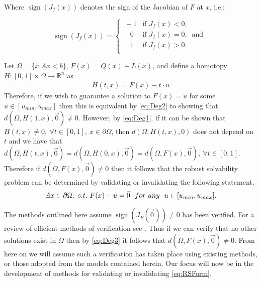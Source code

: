 \documentclass[11pt]{article}
\theoremstyle{plain}
\theoremstyle{definition}
\theoremstyle{remark}
\begin{document}
Where $\operatorname{sign}\left(J_f(x)\right)$ denotes the sign of the Jacobian of $F$ at $x$, i.e.:

\[\operatorname{sign}\left(J_f(x)\right)=   \left\{
\begin{array}{ll}
       \ -1   & \mbox{if } J_f(x)< 0, \\
      \quad 0 & \mbox{if } J_f(x)= 0,~\mbox{ and } \\
      \quad 1 & \mbox{if } J_f(x)> 0. \\
\end{array} 
\right. \]

Let $\Omega=\{x| Ax< b\}$, $F(x)=Q(x)+L(x)$, and define a homotopy $H : [0,1]\times\bar{\Omega}\rightarrow\mathbb{R}^n$ as 
\begin{align}
H(t,x) = F(x)-t\cdot u \label{eq:Homo}
\end{align}
Therefore, if we wish to guarantee a solution to $F(x)=u$ for some $u\in[u_{min},u_{max}]$ then this is equivalent by \cref{eq:Deg2} to showing that $d(\Omega,H(1,x),\vec{0})\neq 0$. However, by \cref{eq:Deg1}, if it can be shown that $H(t,x)\neq 0, \  \forall t\in[0,1], \  x\in\partial\Omega$, then $d\left(\Omega,H(t,x),0\right)$ does not depend on $t$ and we have that $d\left(\Omega,H(t,x),\vec{0}\right)=d\left(\Omega,H(0,x),\vec{0}\right)=d(\Omega,F(x),\vec{0}), \ \forall t\in[0,1]$. \\

Therefore if $d(\Omega,F(x),\vec{0})\neq 0$ then it follows that the robust solvability problem can be determined by validating or invalidating the following statement.
\begin{align}
\not\exists x\in\partial\Omega, \ s.t. \ F(x)-u=\vec{0}	 \ \ for \ any \ \ u\in[u_{min},u_{max}]. \label{eq:RSForm}
\end{align}

The methods outlined here assume $\operatorname{sign}\left(J_F(\vec{0})\right)\neq 0$ has been verified. For a review of efficient methods of verification see \cite{GRIEWANK2014}. Thus if we can verify that no other solutions exist in $\Omega$ then by \cref{eq:Deg3} it follows that $d(\Omega,F(x),\vec{0})\neq 0$. From here on we will assume such a verification has taken place using existing methods, or those adopted from the models contained herein. Our focus will now be in the development of methods for validating or invalidating \cref{eq:RSForm}.\\
\end{document}
